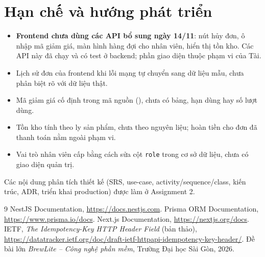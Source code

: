 \documentclass[12pt, a4paper]{article}
\begin{document}
\section{Hạn chế và hướng phát triển}
\begin{itemize}
  \item \textbf{Frontend chưa dùng các API bổ sung ngày 14/11}: nút hủy đơn, ô nhập mã giảm giá, màn hình hàng đợi cho nhân viên,
        hiển thị tồn kho. Các API này đã chạy và có test ở backend; phần giao diện thuộc phạm vi của Tài.
  \item Lịch sử đơn của frontend khi lỗi mạng tự chuyển sang dữ liệu mẫu, chưa phân biệt rõ với dữ liệu thật.
  \item Mã giảm giá cố định trong mã nguồn (), chưa có bảng, hạn dùng hay số lượt dùng.
  \item Tồn kho tính theo ly sản phẩm, chưa theo nguyên liệu; hoàn tiền cho đơn đã thanh toán nằm ngoài phạm vi.
  \item Vai trò nhân viên cấp bằng cách sửa cột \texttt{role} trong cơ sở dữ liệu, chưa có giao diện quản trị.
\end{itemize}
Các nội dung phân tích thiết kế (SRS, use-case, activity/sequence/class, kiến trúc, ADR, triển khai production) được làm ở Assignment 2.

\begin{thebibliography}{9}
 NestJS Documentation, \url{https://docs.nestjs.com}.
 Prisma ORM Documentation, \url{https://www.prisma.io/docs}.
 Next.js Documentation, \url{https://nextjs.org/docs}.
 IETF, \emph{The Idempotency-Key HTTP Header Field} (bản thảo), \url{https://datatracker.ietf.org/doc/draft-ietf-httpapi-idempotency-key-header/}.
 Đề bài lớn \emph{BrewLite -- Công nghệ phần mềm}, Trường Đại học Sài Gòn, 2026.
\end{thebibliography}
\end{document}
